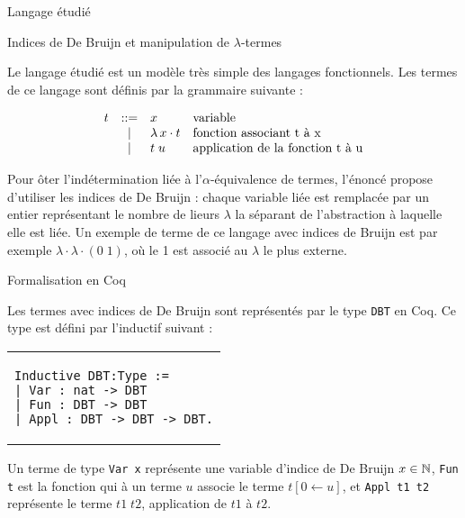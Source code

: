 \documentclass[a4paper,twoside,12pt]{article}
\begin{document}
\begin{partie}{Langage étudié}

\begin{sous-partie}{Indices de De Bruijn et manipulation de $\lambda$-termes}

\begin{paragraph}{}
Le langage étudié est un modèle très simple des langages fonctionnels. Les termes de ce langage sont définis par la grammaire suivante :
\end{paragraph}
$$\begin{array}{rcll}
t&::=&x&\mbox{variable}\\
&|&\lambda\,x\cdot t&\mbox{fonction associant t à x}\\
&|&t\;u&\mbox{application de la fonction t à u}
\end{array}$$
\begin{paragraph}{}
Pour ôter l'indétermination liée à l'$\alpha$-équivalence de termes, l'énoncé propose d'utiliser les indices de De Bruijn : chaque variable liée est remplacée par un entier représentant le nombre de lieurs $\lambda$ la séparant de l'abstraction à laquelle elle est liée. Un exemple de terme de ce langage avec indices de Bruijn est par exemple $\lambda\cdot\lambda\cdot(0\;1)$, où le 1 est associé au $\lambda$ le plus externe.
\end{paragraph}

\end{sous-partie}

\begin{sous-partie}{Formalisation en Coq}

\begin{paragraph}{}
Les termes avec indices de De Bruijn sont représentés par le type \verb|DBT| en Coq. Ce type est défini par l'inductif suivant :
\end{paragraph}\vspace{-0.8cm}
\begin{center}
\begin{tabular}{p{5cm}}
\begin{verbatim}
Inductive DBT:Type :=
| Var : nat -> DBT
| Fun : DBT -> DBT
| Appl : DBT -> DBT -> DBT.
\end{verbatim}
\end{tabular}
\end{center}\vspace{-1cm}
\begin{paragraph}{}
Un terme de type \verb|Var x| représente une variable d'indice de De Bruijn $x\in\mathbb{N}$, \verb|Fun t| est la fonction qui à un terme $u$ associe le terme $t[0\leftarrow u]$, et \verb|Appl t1 t2| représente le terme $t1\;t2$, application de $t1$ à $t2$.
\end{paragraph}


\end{sous-partie}
\end{partie}
\end{document}
